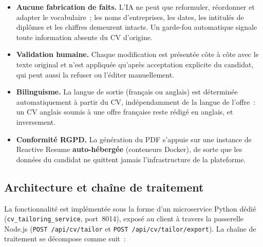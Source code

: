 \begin{itemize}
  \item \textbf{Aucune fabrication de faits.} L'IA ne peut que reformuler, réordonner et adapter le vocabulaire~; les noms d'entreprises, les dates, les intitulés de diplômes et les chiffres demeurent intacts. Un garde-fou automatique signale toute information absente du CV d'origine.
  \item \textbf{Validation humaine.} Chaque modification est présentée côte à côte avec le texte original et n'est appliquée qu'après acceptation explicite du candidat, qui peut aussi la refuser ou l'éditer manuellement.
  \item \textbf{Bilinguisme.} La langue de sortie (français ou anglais) est déterminée automatiquement à partir du CV, indépendamment de la langue de l'offre~: un CV anglais soumis à une offre française reste rédigé en anglais, et inversement.
  \item \textbf{Conformité RGPD.} La génération du PDF s'appuie sur une instance de Reactive Resume \textbf{auto-hébergée} (conteneurs Docker), de sorte que les données du candidat ne quittent jamais l'infrastructure de la plateforme.
\end{itemize}

\subsection{Architecture et chaîne de traitement}

La fonctionnalité est implémentée sous la forme d'un microservice Python dédié (\texttt{cv\_tailoring\_service}, port~8014), exposé au client à travers la passerelle Node.js (\texttt{POST /api/cv/tailor} et \texttt{POST /api/cv/tailor/export}). La chaîne de traitement se décompose comme suit~:


